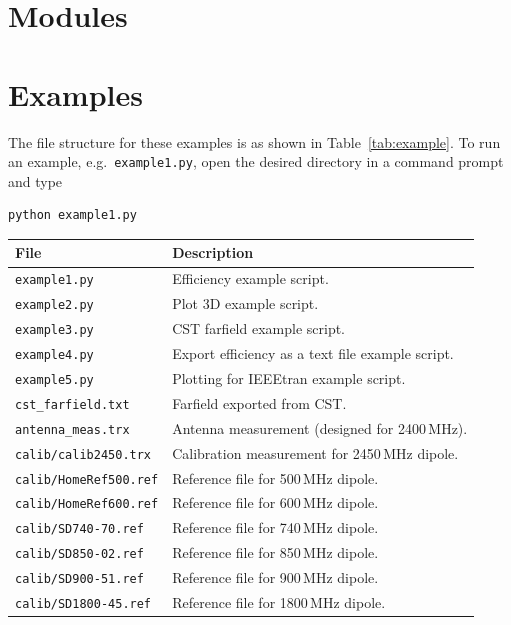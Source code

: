 \documentclass[10pt]{article}
\begin{document}
\section{Modules}


\clearpage
\section{Examples}
The file structure for these examples is as shown in Table~\ref{tab:example}. To run an example, e.g.\ \texttt{example1.py}, open the desired directory in a command prompt and type 
\begin{verbatim}
python example1.py
\end{verbatim}
\begin{table}[htbp]
    \centering
    \begin{tabular}{|l|l|}
        \hline
        File & Description \\
        \hline
        \texttt{example1.py}          & Efficiency example script. \\
        \texttt{example2.py}          & Plot 3D example script. \\
        \texttt{example3.py}          & CST farfield example script. \\
        \texttt{example4.py}          & Export efficiency as a text file example script. \\
        \texttt{example5.py}          & Plotting for IEEEtran example script.  \\
        \hline
        \texttt{cst\_farfield.txt}    & Farfield exported from CST. \\
        \texttt{antenna\_meas.trx}    & Antenna measurement (designed for 2400\,MHz). \\
        \hline
        \texttt{calib/calib2450.trx}  & Calibration measurement for 2450\,MHz dipole. \\
        \hline
        \texttt{calib/HomeRef500.ref} & Reference file for 500\,MHz dipole. \\
        \texttt{calib/HomeRef600.ref} & Reference file for 600\,MHz dipole. \\
        \texttt{calib/SD740-70.ref}   & Reference file for 740\,MHz dipole. \\
        \texttt{calib/SD850-02.ref}   & Reference file for 850\,MHz dipole. \\
        \texttt{calib/SD900-51.ref}   & Reference file for 900\,MHz dipole. \\
        \texttt{calib/SD1800-45.ref}  & Reference file for 1800\,MHz dipole. \\

\end{tabular}
\end{table}
\end{document}
